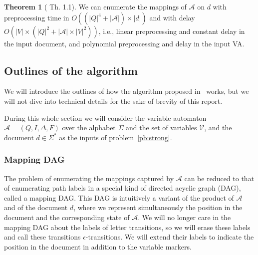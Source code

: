 \documentclass[12px]{article}
\theoremstyle{definition}
\newtheorem{theorem}{Theorem}
\begin{document}
      \begin{theorem}[\cite{ICDT19} Th. 1.1]%
        \label{th:master}
        We can enumerate the mappings of $\mathcal{A}$ on $d$ with
        preprocessing time in $O((|Q|^4 + |\mathcal{A}|) \times |d|)$ and with
        delay $O(|V| \times (|Q|^2 + |\mathcal{A}| \times |V|^2))$, i.e.,
        linear preprocessing and constant delay in the input document, and
        polynomial preprocessing and delay in the input VA.
      \end{theorem}

    \subsection{Outlines of the algorithm}

      We will introduce the outlines of how the algorithm proposed
      in~\cite{ICDT19} works, but we will not dive into technical details for
      the sake of brevity of this report.

      During this whole section we will consider the variable automaton
      $\mathcal{A} = (Q, I, \Delta, F)$ over the alphabet $\Sigma$ and the set
      of variables $\mathcal{V}$, and the document $d \in \Sigma^*$ as the
      inputs of problem~\ref{pb:strong}.

      \subsubsection{Mapping DAG}

        The problem of enumerating the mappings captured by $\mathcal{A}$ can
        be reduced to that of enumerating path labels in a special kind of
        directed acyclic graph (DAG), called a mapping DAG. This DAG is
        intuitively a variant of the product of $\mathcal{A}$ and of the
        document $d$, where we represent simultaneously the position in the
        document and the corresponding state of $\mathcal{A}$. We will no
        longer care in the mapping DAG about the labels of letter transitions,
        so we will erase these labels and call these transitions
        $\epsilon$-transitions.  We will extend their labels to indicate the
        position in the document in addition to the variable markers.
\end{document}
